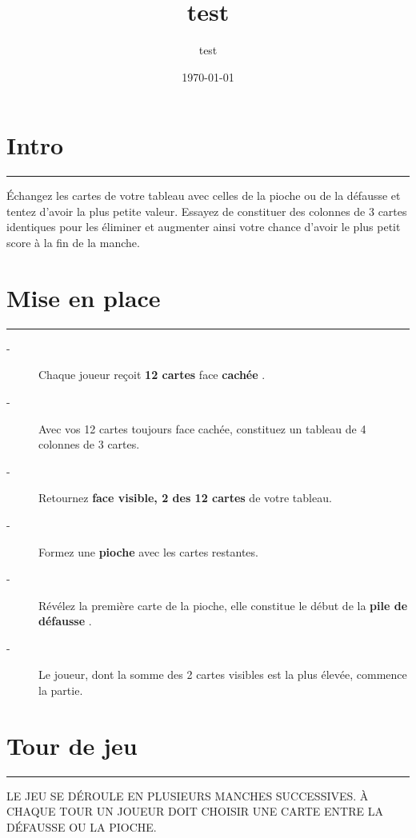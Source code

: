 \documentclass{article}%
\title{test}%
\author{test}%
\date{\today}%
\begin{document}
%
\normalsize%
\maketitle\thispagestyle{header}%
\pagestyle{header}%
\sectionfont{\color{blue}}%
\subsectionfont{\color{blue}}%
\subsubsectionfont{\color{blue}}%
\section{ Intro
}%
\label{sec:Intro}%
\textcolor{blue}{\rule{18cm}{0.07cm}}\break%
Échangez les cartes de votre tableau avec celles de la pioche ou de la défausse et tentez d'avoir la plus petite valeur. Essayez de constituer des colonnes de 3 cartes identiques pour les éliminer et augmenter ainsi votre chance d'avoir le plus petit score à la fin de la manche.


%
\sectionfont{\color{mygreen}}%
\subsectionfont{\color{mygreen}}%
\subsubsectionfont{\color{mygreen}}%
\section{ Mise en place
}%
\label{sec:Miseenplace}%
\textcolor{mygreen}{\rule{18cm}{0.07cm}}\break%
\begin{description}%
\item[{-} ]%
%
 Chaque joueur reçoit %
\textcolor{mygreen}{%
\textbf{12 cartes}%
}%
\textit{ }%
 face %
\textcolor{mygreen}{%
\textbf{cachée}%
}%
.
%
\item[{-} ]%
%
 Avec vos 12 cartes toujours face cachée, constituez un tableau de 4 colonnes de 3 cartes.
%
\item[{-} ]%
%
 Retournez %
\textcolor{mygreen}{%
\textbf{face visible, 2 des 12 cartes}%
}%
\textit{ }%
 de votre tableau.
%
\item[{-} ]%
%
 Formez une %
\textcolor{mygreen}{%
\textbf{pioche}%
}%
\textit{ }%
 avec les cartes restantes.
%
\item[{-} ]%
%
 Révélez la première carte de la pioche, elle constitue le début de la %
\textcolor{mygreen}{%
\textbf{pile de défausse}%
}%
.
%
\item[{-} ]%
%
 Le joueur, dont la somme des 2 cartes visibles est la plus élevée, commence la partie.
%
\end{description}

%
\sectionfont{\color{red}}%
\subsectionfont{\color{red}}%
\subsubsectionfont{\color{red}}%
\section{ Tour de jeu
}%
\label{sec:Tourdejeu}%
\textcolor{red}{\rule{18cm}{0.07cm}}\break%
LE JEU SE DÉROULE EN PLUSIEURS MANCHES SUCCESSIVES. À CHAQUE TOUR UN JOUEUR DOIT CHOISIR UNE CARTE ENTRE LA DÉFAUSSE OU LA PIOCHE.
\end{document}
